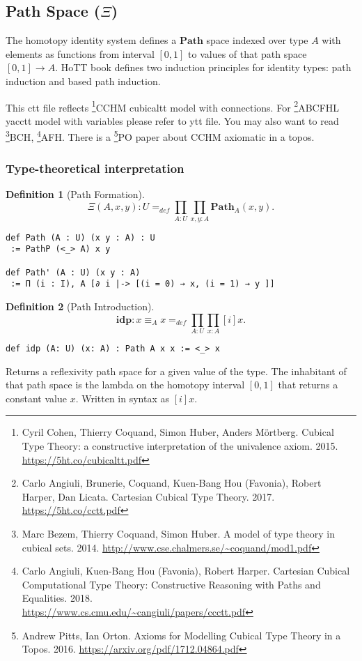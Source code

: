 \documentclass{article}
\theoremstyle{definition}
\newtheorem{definition}{Definition}
\begin{document}
\subsection{Path Space ($\Xi$)}

The homotopy identity system defines a $\mathbf{Path}$ space indexed over type $A$
with elements as functions from interval $[0,1]$ to values
of that path space $[0,1] \rightarrow A$. HoTT book
defines two induction principles for identity types:
path induction and based path induction.

This ctt file reflects \footnote{Cyril Cohen, Thierry Coquand, Simon Huber, Anders M{\"{o}}rtberg. Cubical Type Theory: a constructive interpretation of the univalence axiom. 2015. \url{https://5ht.co/cubicaltt.pdf}}{CCHM} cubicaltt model with connections.
For \footnote{Carlo Angiuli, Brunerie, Coquand, Kuen-Bang Hou (Favonia), Robert Harper, Dan Licata. Cartesian Cubical Type Theory. 2017. \url{https://5ht.co/cctt.pdf}}{ABCFHL} yacctt model with
variables please refer to ytt file. You may also want to
read \footnote{Marc Bezem, Thierry Coquand, Simon Huber. A model of type theory in cubical sets. 2014. \url{http://www.cse.chalmers.se/~coquand/mod1.pdf}}{BCH},
\footnote{Carlo Angiuli, Kuen-Bang Hou (Favonia), Robert Harper. Cartesian Cubical Computational Type Theory: Constructive Reasoning with Paths and Equalities. 2018. \\ \url{https://www.cs.cmu.edu/~cangiuli/papers/ccctt.pdf}}{AFH}.
There is a \footnote{Andrew Pitts, Ian Orton. Axioms for Modelling Cubical Type Theory in a Topos. 2016. \url{https://arxiv.org/pdf/1712.04864.pdf}}{PO} paper about CCHM axiomatic in a topos.

\subsubsection*{Type-theoretical interpretation}

\begin{definition}[Path Formation]
$$
   \Xi(A,x,y) : U =_{def} \prod_{A:U}\prod_{x,y:A} \mathbf{Path}_A(x,y).
$$
\begin{lstlisting}
def Path (A : U) (x y : A) : U
 := PathP (<_> A) x y

def Path' (A : U) (x y : A)
 := Π (i : I), A [∂ i |-> [(i = 0) → x, (i = 1) → y ]]
\end{lstlisting}
\end{definition}

\begin{definition}[Path Introduction]
$$
   \mathbf{idp} : x \equiv_A x =_{def} \prod_{A:U}\prod_{x:A} [i] x.
$$
\begin{lstlisting}[mathescape=true]
def idp (A: U) (x: A) : Path A x x := <_> x
\end{lstlisting}
Returns a reflexivity path space for a given value of the type.
The inhabitant of that path space is the lambda on the homotopy
interval $[0,1]$ that returns a constant value $x$. Written in
syntax as $[i]x$.
\end{definition}
\end{document}
